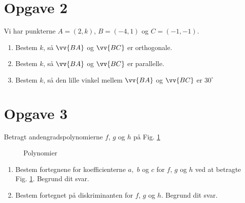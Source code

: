 \section*{Opgave 2}
Vi har punkterne $A = (2,k)$, $B =(-4,1)$ og $C = (-1,-1)$.
\begin{enumerate}[label=\roman*)]
\item Bestem $k$, så $\vv{BA}$ og $\vv{BC}$ er orthogonale.
\item Bestem $k$, så $\vv{BA}$ og $\vv{BC}$ er parallelle. 
\item Bestem $k$, så den lille vinkel mellem $\vv{BA}$ og $\vv{BC}$ er $30^\circ$
\end{enumerate}

\section*{Opgave 3}
Betragt andengradspolynomierne $f$, $g$ og $h$ på Fig. \ref{fig:poly}
\begin{figure}[H]
\centering
{}
\caption{Polynomier}
\label{fig:poly}
\end{figure}
\begin{enumerate}[label=\roman*)]
\item Bestem fortegnene for koefficienterne $a,$ $b$ og $c$ for $f$, $g$ og $h$ ved at betragte Fig. \ref{fig:poly}. Begrund dit svar.
\item Bestem fortegnet på diskriminanten for $f$, $g$ og $h$. Begrund dit svar. 
\end{enumerate}

